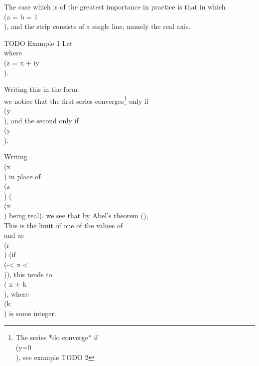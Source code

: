 The case which is of the greatest importance in practice is that in which
\\(a = b = 1\\), and the strip consists of a single line, namely the real axis.

TODO Example 1
Let
\\[ 
f(z)
=
\sin z
- \frac{1}{2} \sin 2z
+ \frac{1}{3} \sin 3z
- \frac{1}{4} \sin 4z
+ \ldots,
\\] 
where \\(z = x + iy\\).
%
%

Writing this in the form
\\[ 
f(z)
=
-
\frac{1}{2}
i
\left(
  e^{iz}
  - \frac{1}{2} e^{2iz}
  + \frac{1}{3} e^{3iz}
  -
  \cdots
\right)
+
\frac{1}{2}
i
\left(
  e^{-iz}
  - \frac{1}{2} e^{-2iz}
  + \frac{1}{3} e^{-3iz}
  -
  \cdots
\right)
\\] 
we notice that the first series converges\footnote{The series
  *do converge* if \\(y=0\\), see  example TODO 2}
only if
\\(y \\), and the second only if \\(y \\).

Writing \\(x\\) in place of \\(z\\) (\\(x\\) being real), we see that by Abel's
theorem (),
\\[ \begin{align*}
  f(x)
  &=
  \lim_{r \rightarrow 1} \left(
    r \sin x
    - \frac{1}{2} r^{2} \sin 2x
    + \frac{1}{3} r^{3} \sin 3x
    - \cdots
  \right)
  \\
  &=
  \lim_{r \rightarrow 1} \left\{ 
    - \frac{1}{2} \left(
      r e^{ix}
      - \frac{1}{2} r^{2} e^{2ix}
      + \frac{1}{3} r^{3} e^{3ix}
      - \cdots
    \right)
    +
    \frac{1}{2} i \left(
      r e^{-ix}
      - \frac{1}{2} r^{2} e^{-2ix}
      + \frac{1}{3} r^{3} e^{-3ix}
      - \cdots
    \right)
  \right\}
\end{align*} \\]

This is the limit of one of the values of
\\[ 
- \frac{1}{2} i \log (1 + r e^{ix})
+ \frac{1}{2} i \log (1 + r e^{-ix}),
\\] 
and as \\(r \\) (if \\(-\pi < x < \pi\\)), this tends to
\\( x + k\pi\\), where \\(k\\) is some integer.

